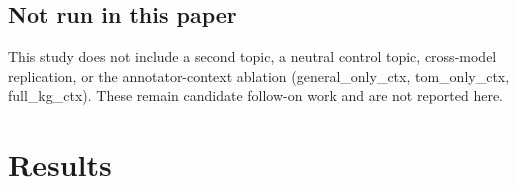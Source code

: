\documentclass[11pt,a4paper]{article}
\newcommand{\cond}[1]{\textsf{#1}}
\begin{document}
\subsection{Not run in this paper}\label{sec:4.5}

This study does not include a second topic, a neutral control topic, cross-model replication, or the annotator-context ablation (\cond{general\_only\_ctx}, \cond{tom\_only\_ctx}, \cond{full\_kg\_ctx}). These remain candidate follow-on work and are not reported here.

%

\section{Results}\label{sec:5}
\end{document}
